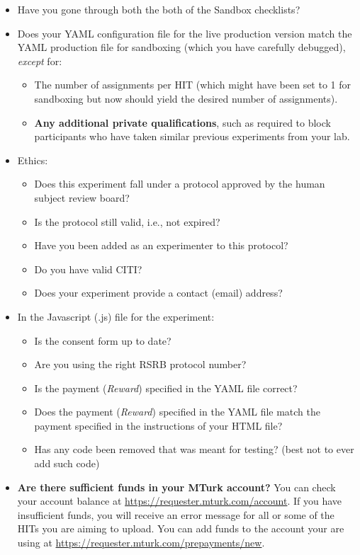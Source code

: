 \documentclass{article}
\begin{document}
\begin{tcolorbox}[colback=gray!5,colframe=blue!40!black,title=Final checklist]
\begin{itemize}
    \item Have you gone through both the both of the Sandbox checklists?
    \item Does your YAML configuration file for the live production version match the YAML production file for sandboxing (which you have carefully debugged), {\em except} for:
    \begin{itemize}
      \item The number of assignments per HIT (which might have been set to 1 for sandboxing but now should yield the desired number of assignments).
      \item \textbf{Any additional private qualifications}, such as required to block participants who have taken similar previous experiments from your lab.
    \end{itemize}
    \item Ethics:
    \begin{itemize}
        \item Does this experiment fall under a protocol approved by the human subject review board?
        \item Is the protocol still valid, i.e., not expired?
        \item Have you been added as an experimenter to this protocol?
        \item Do you have valid CITI?
        \item Does your experiment provide a contact (email) address?
    \end{itemize}
    \item In the Javascript (.js) file for the experiment:
    \begin{itemize}
        \item Is the consent form up to date?
        \item Are you using the right RSRB protocol number?
        \item Is the payment ({\em Reward}) specified in the YAML file correct?
        \item Does the payment ({\em Reward}) specified in the YAML file match the payment specified in the instructions of your HTML file?
        \item Has any code been removed that was meant for testing? (best not to ever add such code)
    \end{itemize}
    \item {\bf Are there sufficient funds in your MTurk account?}  You can check your account balance at \url{https://requester.mturk.com/account}. If you have insufficient funds, you will receive an error message for all or some of the HITs you are aiming to upload. You can add funds to the account your are using at \url{https://requester.mturk.com/prepayments/new}.
\end{itemize}
\end{tcolorbox}
\end{document}
